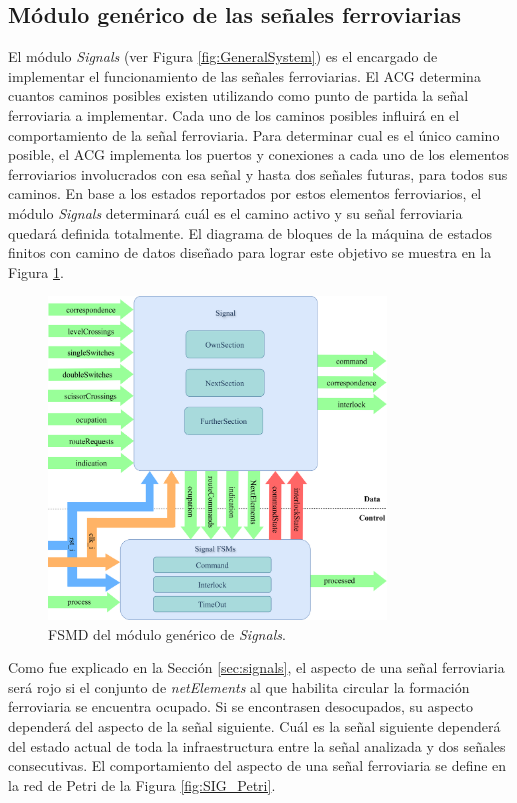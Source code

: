 \subsection{Módulo genérico de las señales ferroviarias}
	\label{sec:ACG_sig}
	
	El módulo \textit{Signals} (ver Figura \ref{fig:GeneralSystem}) es el encargado de implementar el funcionamiento de las señales ferroviarias. El ACG determina cuantos caminos posibles existen utilizando como punto de partida la señal ferroviaria a implementar. Cada uno de los caminos posibles influirá en el comportamiento de la señal ferroviaria. Para determinar cual es el único camino posible, el ACG implementa los puertos y conexiones a cada uno de los elementos ferroviarios involucrados con esa señal y hasta dos señales futuras, para todos sus caminos. En base a los estados reportados por estos elementos ferroviarios, el módulo \textit{Signals} determinará cuál es el camino activo y su señal ferroviaria quedará definida totalmente. El diagrama de bloques de la máquina de estados finitos con camino de datos diseñado para lograr este objetivo se muestra en la Figura \ref{fig:SIG_module}.
	
	\begin{figure}[H]
		\centering
		\includegraphics[width=0.8\textwidth]{Figuras/SIG_module}
		\centering\caption{FSMD del módulo genérico de \textit{Signals}.}
		\label{fig:SIG_module}
	\end{figure}
	
	Como fue explicado en la Sección \ref{sec:signals}, el aspecto de una señal ferroviaria será rojo si el conjunto de \textit{netElements} al que habilita circular la formación ferroviaria se encuentra ocupado. Si se encontrasen desocupados, su aspecto dependerá del aspecto de la señal siguiente. Cuál es la señal siguiente dependerá del estado actual de toda la infraestructura entre la señal analizada y dos señales consecutivas. El comportamiento del aspecto de una señal ferroviaria se define en la red de Petri de la Figura \ref{fig:SIG_Petri}.
	
